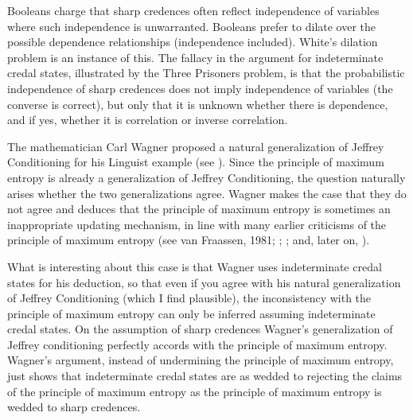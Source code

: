 Booleans charge that sharp credences often reflect
independence of variables where such independence is
unwarranted. Booleans prefer to dilate over the
possible dependence relationships (independence
included). White's dilation problem is an instance of
this. The fallacy in the argument for indeterminate
credal states, illustrated by the Three Prisoners
problem, is that the probabilistic independence of
sharp credences does not imply independence of
variables (the converse is correct), but only that it
is unknown whether there is dependence, and if yes,
whether it is correlation or inverse correlation.


The mathematician Carl Wagner proposed a natural
generalization of Jeffrey Conditioning for his Linguist
example (see ). Since the
principle of maximum entropy is already a
generalization of Jeffrey Conditioning, the question
naturally arises whether the two generalizations agree.
Wagner makes the case that they do not agree and
deduces that the principle of maximum entropy is
sometimes an inappropriate updating mechanism, in line
with many earlier criticisms of the principle of
maximum entropy (see van Fraassen, 1981;
; ;
and, later on, ).

What is interesting about this case is that Wagner uses
indeterminate credal states for his deduction, so that
even if you agree with his natural generalization of
Jeffrey Conditioning (which I find plausible), the
inconsistency with the principle of maximum entropy can
only be inferred assuming indeterminate credal states.
On the assumption of sharp credences Wagner's
generalization of Jeffrey conditioning perfectly
accords with the principle of maximum entropy. Wagner's
argument, instead of undermining the principle of
maximum entropy, just shows that indeterminate credal
states are as wedded to rejecting the claims of the
principle of maximum entropy as the principle of
maximum entropy is wedded to sharp credences.

